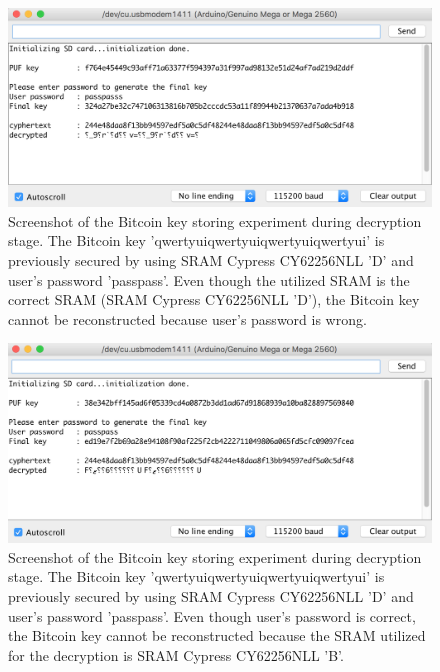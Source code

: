 \begin{figure}[tph!]
    \centerline{\includegraphics[width={\textwidth}]{images/D_decrypt_wrong_password}}
    \caption{Screenshot of the Bitcoin key storing experiment during decryption stage. The Bitcoin key 'qwertyuiqwertyuiqwertyuiqwertyui' is previously secured by using SRAM Cypress CY62256NLL 'D' and user's password 'passpass'.
    Even though the utilized SRAM is the correct SRAM (SRAM Cypress CY62256NLL 'D'), the Bitcoin key cannot be reconstructed because user's password is wrong.}
    \label{fig:D_decrypt_wrong_password}
\end{figure}

\begin{figure}[tph!]
    \centerline{\includegraphics[width={\textwidth}]{images/D_decrypt_wrong_SRAM}}
    \caption{Screenshot of the Bitcoin key storing experiment during decryption stage. The Bitcoin key 'qwertyuiqwertyuiqwertyuiqwertyui' is previously secured by using SRAM Cypress CY62256NLL 'D' and user's password 'passpass'.
    Even though user's password is correct, the Bitcoin key cannot be reconstructed because the SRAM utilized for the decryption is SRAM Cypress CY62256NLL 'B'.}
    \label{fig:D_decrypt_wrong_SRAM}
\end{figure}

